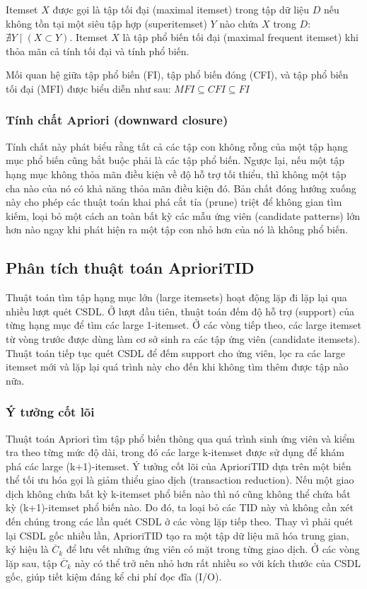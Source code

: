 \documentclass[12pt]{article}
\begin{document}
Itemset $X$ được gọi là tập tối đại (maximal itemset) trong tập dữ liệu $D$ nếu không tồn tại một siêu tập hợp (superitemset) $Y$ nào chứa $X$ trong $D$: $\nexists Y \mid (X \subset Y)$. Itemset $X$ là tập phổ biến tối đại (maximal frequent itemset) khi thỏa mãn cả tính tối đại và tính phổ biến.

Mối quan hệ giữa tập phổ biến (FI), tập phổ biến đóng (CFI), và tập phổ biến tối đại (MFI) được biểu diễn như sau: $MFI\subseteq CFI \subseteq FI$

\subsubsection{Tính chất Apriori (downward closure)}
Tính chất này phát biểu rằng tất cả các tập con không rỗng của một tập hạng mục phổ biến cũng bắt buộc phải là các tập phổ biến. Ngược lại, nếu một tập hạng mục không thỏa mãn điều kiện về độ hỗ trợ tối thiểu, thì không một tập cha nào của nó có khả năng thỏa mãn điều kiện đó. Bản chất đóng hướng xuống này cho phép các thuật toán khai phá cắt tỉa (prune) triệt để không gian tìm kiếm, loại bỏ một cách an toàn bất kỳ các mẫu ứng viên (candidate patterns) lớn hơn nào ngay khi phát hiện ra một tập con nhỏ hơn của nó là không phổ biến.

\subsection{Phân tích thuật toán AprioriTID}
\label{subsec: AprioriTID}
Thuật toán tìm tập hạng mục lớn (large itemsets) hoạt động lặp đi lặp lại qua nhiều lượt quét CSDL. Ở lượt đầu tiên, thuật toán đếm độ hỗ trợ (support) của từng hạng mục để tìm các large 1-itemset. Ở các vòng tiếp theo, các large itemset từ vòng trước được dùng làm cơ sở sinh ra các tập ứng viên (candidate itemsets). Thuật toán tiếp tục quét CSDL để đếm support cho ứng viên, lọc ra các large itemset mới và lặp lại quá trình này cho đến khi không tìm thêm được tập nào nữa.

\subsubsection{Ý tưởng cốt lõi}
Thuật toán Apriori tìm tập phổ biến thông qua quá trình sinh ứng viên và kiểm tra theo từng mức độ dài, trong đó các large k-itemset được sử dụng để khám phá các large (k+1)-itemset. Ý tưởng cốt lõi của AprioriTID dựa trên một biến thể tối ưu hóa gọi là giảm thiểu giao dịch (transaction reduction). Nếu một giao dịch không chứa bất kỳ k-itemset phổ biến nào thì nó cũng không thể chứa bất kỳ (k+1)-itemset phổ biến nào. Do đó, ta loại bỏ các TID này và không cần xét đến chúng trong các lần quét CSDL ở các vòng lặp tiếp theo. Thay vì phải quét lại CSDL gốc nhiều lần, AprioriTID tạo ra một tập dữ liệu mã hóa trung gian, ký hiệu là $\overline{C}_k$ để lưu vết những ứng viên có mặt trong từng giao dịch. Ở các vòng lặp sau, tập $\overline{C}_k$ này có thể trở nên nhỏ hơn rất nhiều so với kích thước của CSDL gốc, giúp tiết kiệm đáng kể chi phí đọc đĩa (I/O).
\end{document}
